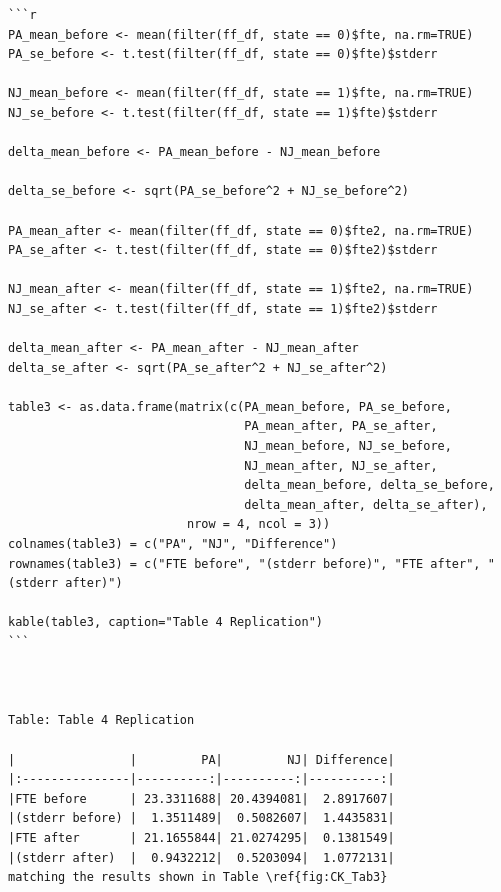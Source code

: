 \documentclass[
]{article}
\begin{document}
\begin{verbatim}
```r
PA_mean_before <- mean(filter(ff_df, state == 0)$fte, na.rm=TRUE)
PA_se_before <- t.test(filter(ff_df, state == 0)$fte)$stderr

NJ_mean_before <- mean(filter(ff_df, state == 1)$fte, na.rm=TRUE)
NJ_se_before <- t.test(filter(ff_df, state == 1)$fte)$stderr

delta_mean_before <- PA_mean_before - NJ_mean_before

delta_se_before <- sqrt(PA_se_before^2 + NJ_se_before^2)

PA_mean_after <- mean(filter(ff_df, state == 0)$fte2, na.rm=TRUE)
PA_se_after <- t.test(filter(ff_df, state == 0)$fte2)$stderr

NJ_mean_after <- mean(filter(ff_df, state == 1)$fte2, na.rm=TRUE)
NJ_se_after <- t.test(filter(ff_df, state == 1)$fte2)$stderr

delta_mean_after <- PA_mean_after - NJ_mean_after
delta_se_after <- sqrt(PA_se_after^2 + NJ_se_after^2)

table3 <- as.data.frame(matrix(c(PA_mean_before, PA_se_before,
                                 PA_mean_after, PA_se_after,
                                 NJ_mean_before, NJ_se_before,
                                 NJ_mean_after, NJ_se_after,
                                 delta_mean_before, delta_se_before,
                                 delta_mean_after, delta_se_after),
                         nrow = 4, ncol = 3))
colnames(table3) = c("PA", "NJ", "Difference")
rownames(table3) = c("FTE before", "(stderr before)", "FTE after", "(stderr after)")

kable(table3, caption="Table 4 Replication")
```



Table: Table 4 Replication

|                |         PA|         NJ| Difference|
|:---------------|----------:|----------:|----------:|
|FTE before      | 23.3311688| 20.4394081|  2.8917607|
|(stderr before) |  1.3511489|  0.5082607|  1.4435831|
|FTE after       | 21.1655844| 21.0274295|  0.1381549|
|(stderr after)  |  0.9432212|  0.5203094|  1.0772131|
matching the results shown in Table \ref{fig:CK_Tab3}
\end{verbatim}
\end{document}
